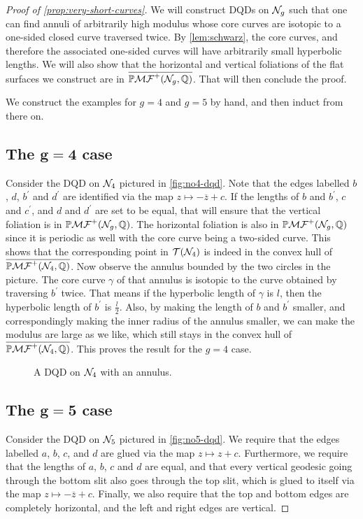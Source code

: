 \documentclass[12pt, reqno]{amsart}
\begin{document}
\begin{proof}[Proof of \autoref{prop:very-short-curves}]
  We will construct DQDs on $\mathcal{N}_g$ such that one can find annuli of arbitrarily high modulus whose core curves are isotopic to a one-sided closed curve traversed twice.
  By \autoref{lem:schwarz}, the core curves, and therefore the associated one-sided curves will have arbitrarily small hyperbolic lengths.
  We will also show that the horizontal and vertical foliations of the flat surfaces we
  construct are in $\overline{\mathbb{P}\mathcal{MF}^+(\mathcal{N}_g, \mathbb{Q})}$.
  That will then conclude the proof.

  We construct the examples for $g=4$ and $g=5$ by hand, and then induct from there on.

\subsection*{The $\mathbf{g=4}$ case}
Consider the DQD on $\mathcal{N}_4$ pictured in \autoref{fig:no4-dqd}.
Note that the edges labelled $b$, $d$, $b^{\prime}$ and $d^{\prime}$ are identified via the map $z \mapsto -\overline{z} + c$.
If the lengths of $b$ and $b^{\prime}$, $c$ and $c^{\prime}$, and $d$ and $d^{\prime}$ are set to be equal, that will ensure that the vertical foliation is in $\mathbb{P}\mathcal{MF}^+(\mathcal{N}_g, \mathbb{Q})$.
The horizontal foliation is also in $\mathbb{P}\mathcal{MF}^+(\mathcal{N}_g, \mathbb{Q})$ since it is periodic as well with the core curve being a two-sided curve.
This shows that the corresponding point in $\mathcal{T}(\mathcal{N}_4)$ is indeed in the convex hull of $\overline{\mathbb{P}\mathcal{MF}^+(\mathcal{N}_4, \mathbb{Q})}$.
Now observe the annulus bounded by the two circles in the picture.
The core curve $\gamma$ of that annulus is isotopic to the curve obtained by traversing $b^{\prime}$ twice.
That means if the hyperbolic length of $\gamma$ is $l$, then the hyperbolic length of $b^{\prime}$ is $\frac{l}{2}$.
Also, by making the length of $b$ and $b^{\prime}$ smaller, and correspondingly making the inner radius of the annulus smaller, we can make the modulus are large as we like, which still stays in the convex hull of $\overline{\mathbb{P}\mathcal{MF}^+(\mathcal{N}_4, \mathbb{Q})}$.
This proves the result for the $g=4$ case.
\begin{figure}[h]
  \centering
  \caption{A DQD on $\mathcal{N}_4$ with an annulus.}
  \label{fig:no4-dqd}
\end{figure}

\subsection*{The $\mathbf{g=5}$ case}
Consider the DQD on $\mathcal{N}_5$ pictured in \autoref{fig:no5-dqd}.
We require that the edges labelled $a$, $b$, $c$, and $d$ are glued via the map $z \mapsto z + c$.
Furthermore, we require that the lengths of $a$, $b$, $c$ and $d$ are equal, and that every vertical geodesic going through the bottom slit also goes through the top slit, which is glued to itself via the map $z \mapsto -\overline{z} + c$.
Finally, we also require that the top and bottom edges are completely horizontal, and the left and right edges are vertical.


\end{proof}
\end{document}
